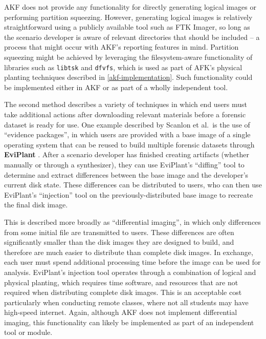 \documentclass[letterpaper,12pt]{report}
\newcommand{\passthrough}[1]{#1}
\begin{document}
AKF does not provide any functionality for directly generating logical
images or performing partition squeezing. However, generating logical
images is relatively straightforward using a publicly available tool
such as FTK Imager, so long as the scenario developer is aware of
relevant directories that should be included -- a process that might
occur with AKF's reporting features in mind. Partition squeezing might
be achieved by leveraging the filesystem-aware functionality of
libraries such as \passthrough{\lstinline!libtsk!} and
\passthrough{\lstinline!dfvfs!}, which is used as part of AFK's physical
planting techniques described in \autoref{akf-implementation}. Such functionality could be implemented either in
AKF or as part of a wholly independent tool.

The second method describes a variety of techniques in which end users
must take additional actions after downloading relevant materials before
a forensic dataset is ready for use. One example described by Scanlon et
al.~is the use of ``evidence packages'', in which users are provided
with a base image of a single operating system that can be reused to
build multiple forensic datasets through \textbf{EviPlant}
\cite{scanlonEviPlantEfficientDigital2017}. After a scenario
developer has finished creating artifacts (whether manually or through a
synthesizer), they can use EviPlant's ``diffing'' tool to determine and
extract differences between the base image and the developer's current
disk state. These differences can be distributed to users, who can then
use EviPlant's ``injection'' tool on the previously-distributed base
image to recreate the final disk image.

This is described more broadly as ``differential imaging'', in which
only differences from some initial file are transmitted to users. These
differences are often significantly smaller than the disk images they
are designed to build, and therefore are much easier to distribute than
complete disk images. In exchange, each user must spend additional
processing time before the image can be used for analysis. EviPlant's
injection tool operates through a combination of logical and physical
planting, which requires time software, and resources that are not
required when distributing complete disk images. This is an acceptable
cost particularly when conducting remote classes, where not all students
may have high-speed internet. Again, although AKF does not implement
differential imaging, this functionality can likely be implemented as
part of an independent tool or module.
\end{document}
